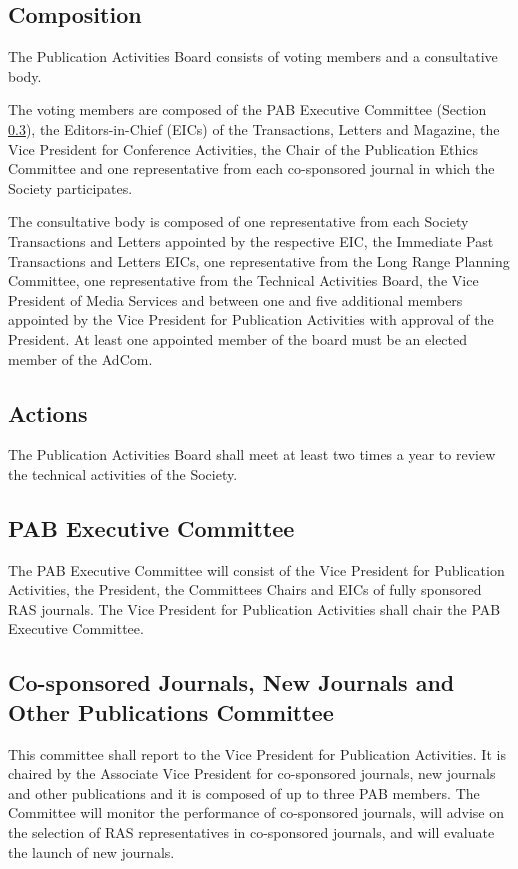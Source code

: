 \documentclass[10pt]{article}
\newcommand{\secref}[1]{Section \ref{#1}}
\begin{document}
\subsection{Composition}

The Publication Activities Board consists of voting members and a consultative body. 

The voting members are composed of the PAB Executive Committee (\secref{PAB:ExCom}), the Editors-in-Chief (EICs) of the Transactions, Letters and Magazine, the Vice President for Conference Activities, the Chair of the Publication Ethics Committee and one representative from each co-sponsored journal in which the Society participates. 

The consultative body is composed of one representative from each Society Transactions and Letters appointed by the respective EIC, the Immediate Past Transactions and Letters EICs, one representative from the Long Range Planning Committee, one representative from the Technical Activities Board, the Vice President of Media Services and between one and five additional  members appointed by the Vice President for Publication Activities with approval of the President. At least one appointed member of the board must be an elected member of the AdCom.


\subsection{Actions}

The Publication Activities Board shall meet at least two times a year to review the technical activities of the Society.

\subsection{PAB Executive Committee}
\label{PAB:ExCom}

The PAB Executive Committee will consist of the Vice President for Publication Activities, the President, the Committees Chairs and EICs of fully sponsored RAS journals. The Vice President for Publication Activities shall chair the PAB Executive Committee.


\subsection{Co-sponsored Journals, New Journals and Other Publications Committee}

This committee shall report to the Vice President for Publication Activities. It is chaired by the Associate Vice President for co-sponsored journals, new journals and other publications and it is composed of up to three PAB members. The Committee will monitor the performance of co-sponsored journals, will advise on the selection of RAS representatives in co-sponsored journals, and will evaluate the launch of new journals. 
\end{document}
